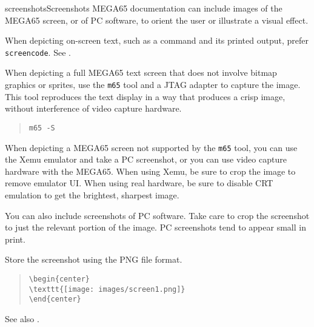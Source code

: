 \begin{sgentry}{screenshots}{Screenshots}
    MEGA65 documentation can include images of the MEGA65 screen, or of PC software, to orient the user or illustrate a visual effect.

    When depicting on-screen text, such as a command and its printed output, prefer \texttt{screencode}. See .

    When depicting a full MEGA65 text screen that does not involve bitmap graphics or sprites, use the \texttt{m65} tool and a JTAG adapter to capture the image. This tool reproduces the text display in a way that produces a crisp image, without interference of video capture hardware.

    \begin{quote}
        \texttt{m65 -S}
    \end{quote}

    When depicting a MEGA65 screen not supported by the \texttt{m65} tool, you can use the Xemu emulator and take a PC screenshot, or you can use video capture hardware with the MEGA65. When using Xemu, be sure to crop the image to remove emulator UI. When using real hardware, be sure to disable CRT emulation to get the brightest, sharpest image.

    You can also include screenshots of PC software. Take care to crop the screenshot to just the relevant portion of the image. PC screenshots tend to appear small in print.

    Store the screenshot using the PNG file format.

    \begin{quote}
\begin{verbatim}
\begin{center}
\texttt{[image: images/screen1.png]}
\end{center}
\end{verbatim}
    \end{quote}

    See also .
\end{sgentry}

